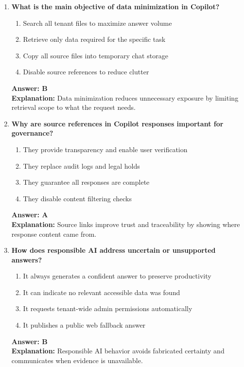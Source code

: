 \documentclass[10pt]{article}
\begin{document}
\begin{enumerate}[leftmargin=*]
\item \textbf{What is the main objective of data minimization in Copilot?}
\begin{enumerate}[label=\Alph*.]
  \item Search all tenant files to maximize answer volume
  \item Retrieve only data required for the specific task
  \item Copy all source files into temporary chat storage
  \item Disable source references to reduce clutter
\end{enumerate}
\textbf{Answer: B}\\
\textbf{Explanation:} Data minimization reduces unnecessary exposure by limiting retrieval scope to what the request needs.

\item \textbf{Why are source references in Copilot responses important for governance?}
\begin{enumerate}[label=\Alph*.]
  \item They provide transparency and enable user verification
  \item They replace audit logs and legal holds
  \item They guarantee all responses are complete
  \item They disable content filtering checks
\end{enumerate}
\textbf{Answer: A}\\
\textbf{Explanation:} Source links improve trust and traceability by showing where response content came from.

\item \textbf{How does responsible AI address uncertain or unsupported answers?}
\begin{enumerate}[label=\Alph*.]
  \item It always generates a confident answer to preserve productivity
  \item It can indicate no relevant accessible data was found
  \item It requests tenant-wide admin permissions automatically
  \item It publishes a public web fallback answer
\end{enumerate}
\textbf{Answer: B}\\
\textbf{Explanation:} Responsible AI behavior avoids fabricated certainty and communicates when evidence is unavailable.


\end{enumerate}
\end{document}

